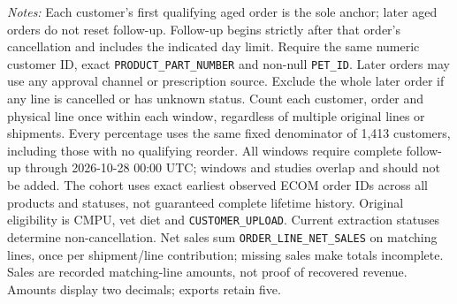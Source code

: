 \begin{table}[!htbp]
\begin{minipage}{\linewidth}
\footnotesize
\textit{Notes:} Each customer's first qualifying aged order is the sole anchor;
later aged orders do not reset follow-up. Follow-up begins strictly after that
order's cancellation and includes the indicated day limit. Require the same
numeric customer ID, exact \texttt{PRODUCT\_PART\_NUMBER} and non-null
\texttt{PET\_ID}. Later orders may use any approval channel or prescription
source. Exclude the whole later order if any line is cancelled or has unknown
status. Count each customer, order and physical line once within each window,
regardless of multiple original lines or shipments. Every percentage uses the
same fixed denominator of 1,413 customers, including those with no
qualifying reorder. All windows require complete follow-up through
2026-10-28 00:00 UTC; windows and studies overlap and should not be added.
The cohort uses exact earliest observed ECOM order IDs across all products and statuses, not guaranteed complete lifetime history. Original eligibility is CMPU,
vet diet and \texttt{CUSTOMER\_UPLOAD}. Current extraction statuses determine
non-cancellation. Net sales sum \texttt{ORDER\_LINE\_NET\_SALES} on matching
lines, once per shipment/line contribution; missing sales make totals incomplete.
Sales are recorded matching-line amounts, not proof of recovered revenue.
Amounts display two decimals; exports retain five.
\end{minipage}
\end{table}
